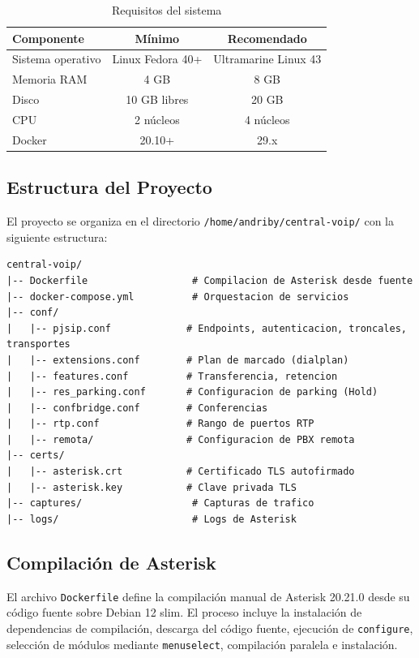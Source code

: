 \documentclass[12pt,a4paper]{article}
\begin{document}
\begin{table}[H]
\centering
\caption{Requisitos del sistema}
\label{tab:requisitos}
\begin{tabular}{@{}lcc@{}}
\toprule
\textbf{Componente} & \textbf{Mínimo} & \textbf{Recomendado} \\
\midrule
Sistema operativo & Linux Fedora 40+ & Ultramarine Linux 43 \\
Memoria RAM & 4 GB & 8 GB \\
Disco & 10 GB libres & 20 GB \\
CPU & 2 núcleos & 4 núcleos \\
Docker & 20.10+ & 29.x \\
\bottomrule
\end{tabular}
\end{table}

\subsection{Estructura del Proyecto}

El proyecto se organiza en el directorio \texttt{/home/andriby/central-voip/} con la siguiente estructura:

\begin{lstlisting}
central-voip/
|-- Dockerfile                  # Compilacion de Asterisk desde fuente
|-- docker-compose.yml          # Orquestacion de servicios
|-- conf/
|   |-- pjsip.conf             # Endpoints, autenticacion, troncales, transportes
|   |-- extensions.conf        # Plan de marcado (dialplan)
|   |-- features.conf          # Transferencia, retencion
|   |-- res_parking.conf       # Configuracion de parking (Hold)
|   |-- confbridge.conf        # Conferencias
|   |-- rtp.conf               # Rango de puertos RTP
|   |-- remota/                # Configuracion de PBX remota
|-- certs/
|   |-- asterisk.crt           # Certificado TLS autofirmado
|   |-- asterisk.key           # Clave privada TLS
|-- captures/                   # Capturas de trafico
|-- logs/                       # Logs de Asterisk
\end{lstlisting}

\subsection{Compilación de Asterisk}

El archivo \texttt{Dockerfile} define la compilación manual de Asterisk 20.21.0 desde su código fuente sobre Debian 12 slim. El proceso incluye la instalación de dependencias de compilación, descarga del código fuente, ejecución de \texttt{configure}, selección de módulos mediante \texttt{menuselect}, compilación paralela e instalación.
\end{document}
